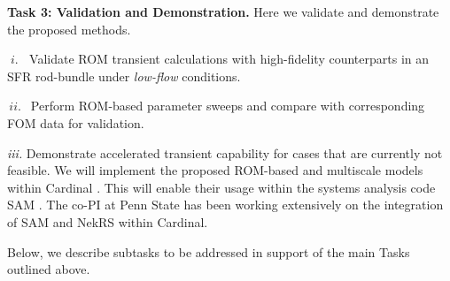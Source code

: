 \noindent
\textbf{Task 3: Validation and Demonstration.} 
Here we validate and demonstrate the proposed methods.
\\[-4ex]
\begin{description}
\item{$\; i.\; \;$}
Validate ROM transient calculations with high-fidelity counterparts
in an SFR rod-bundle under \textit{low-flow} conditions.
\\[-4ex]
\item{$\, ii. \,\;$}
Perform ROM-based parameter sweeps and compare with corresponding
FOM data for validation.
\\[-4ex]
\item{\em iii.}
Demonstrate accelerated transient capability for cases that are currently not
feasible. We will implement the proposed ROM-based and multiscale models within
Cardinal \cite{cardinal}. This will enable their usage within the systems
analysis code SAM \cite{hu2021}. The co-PI at Penn State has been working
extensively on the integration of SAM and NekRS within Cardinal.
\\[-3ex]
\end{description}
Below, we describe subtasks to be addressed in support of the main Tasks
outlined above.
\newpage
